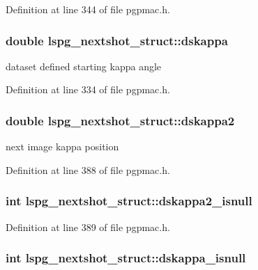 Definition at line 344 of file pgpmac.\-h.

\hypertarget{structlspg__nextshot__struct_a59355281e8eb935cd7bfac597fdc5289}{
\subsubsection[{dskappa}]{\setlength{\rightskip}{0pt plus 5cm}double lspg\-\_\-nextshot\-\_\-struct\-::dskappa}}\label{structlspg__nextshot__struct_a59355281e8eb935cd7bfac597fdc5289}


dataset defined starting kappa angle 



Definition at line 334 of file pgpmac.\-h.

\hypertarget{structlspg__nextshot__struct_a8571a0b95fb6ea6356fd7204b9c9e371}{
\subsubsection[{dskappa2}]{\setlength{\rightskip}{0pt plus 5cm}double lspg\-\_\-nextshot\-\_\-struct\-::dskappa2}}\label{structlspg__nextshot__struct_a8571a0b95fb6ea6356fd7204b9c9e371}


next image kappa position 



Definition at line 388 of file pgpmac.\-h.

\hypertarget{structlspg__nextshot__struct_a9a7e47372f4f6e0e48a0cb3c78fa8437}{
\subsubsection[{dskappa2\-\_\-isnull}]{\setlength{\rightskip}{0pt plus 5cm}int lspg\-\_\-nextshot\-\_\-struct\-::dskappa2\-\_\-isnull}}\label{structlspg__nextshot__struct_a9a7e47372f4f6e0e48a0cb3c78fa8437}


Definition at line 389 of file pgpmac.\-h.

\hypertarget{structlspg__nextshot__struct_a1686a72509cc1c3383ee95a790ddff14}{
\subsubsection[{dskappa\-\_\-isnull}]{\setlength{\rightskip}{0pt plus 5cm}int lspg\-\_\-nextshot\-\_\-struct\-::dskappa\-\_\-isnull}}\label{structlspg__nextshot__struct_a1686a72509cc1c3383ee95a790ddff14}


